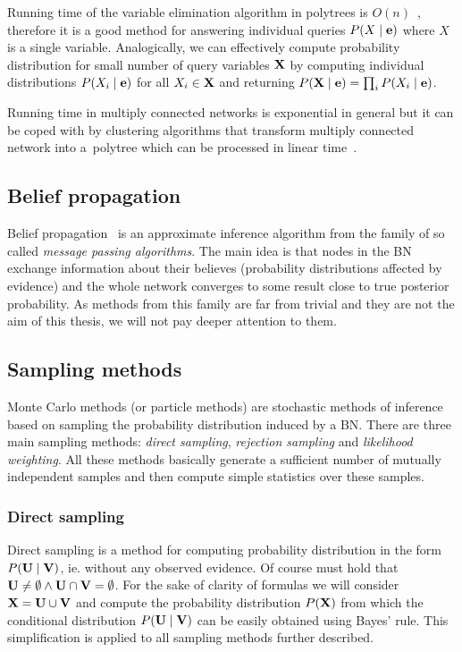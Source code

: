 \documentclass[english,cover]{fitthesis} %
\newcommand{\term}[1]{\emph{#1}}           %
\newcommand{\vars}[1]{{\bold{#1}}}         %
\begin{document}
Running time of the variable elimination algorithm in polytrees is $O(n)$~\cite[p.~510]{russell_norvig_ed2}, therefore it is a good method for answering individual queries $P(X \mid \vars{e})$ where $X$ is a single variable. Analogically, we can effectively compute probability distribution for small number of query variables $\vars{X}$ by computing individual distributions $P(X_i \mid \vars{e})$ for all $X_i \in \vars{X}$ and returning $P(\vars{X} \mid \vars{e}) = \prod_i P(X_i \mid \vars{e})$.

Running time in multiply connected networks is exponential in general but it can be coped with by clustering algorithms that transform multiply connected network into a~polytree which can be processed in linear time~\cite{russell_norvig_ed2}.


\subsection{Belief propagation}
Belief propagation~\cite{pgm} is an approximate inference algorithm from the family of so called \term{message passing algorithms}. The main idea is that nodes in the BN exchange information about their believes (probability distributions affected by evidence) and the whole network converges to some result close to true posterior probability. As methods from this family are far from trivial and they are not the aim of this thesis, we will not pay deeper attention to them.

\subsection{Sampling methods}
Monte Carlo methods (or particle methods) are stochastic methods of inference based on sampling the probability distribution induced by a BN. There are three main sampling methods: \term{direct sampling}, \term{rejection sampling} and \term{likelihood weighting}. All these methods basically generate a sufficient number of mutually independent samples and then compute simple statistics over these samples.

\subsubsection{Direct sampling}
Direct sampling is a method for computing probability distribution in the form $P(\vars{U} \mid \vars{V})$, ie. without any observed evidence. Of course must hold that $\vars{U} \neq \emptyset \wedge \vars{U} \cap \vars{V} = \emptyset$. For the sake of clarity of formulas we will consider $\vars{X} = \vars{U} \cup \vars{V}$ and compute the probability distribution $P(\vars{X})$ from which the conditional distribution $P(\vars{U} \mid \vars{V})$ can be easily obtained using Bayes' rule. This simplification is applied to all sampling methods further described. 
\end{document}
